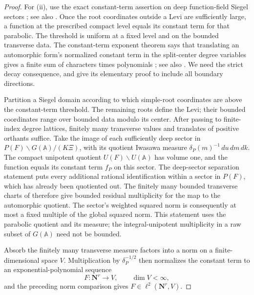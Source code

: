 \begin{proof}
 For (ii), use the exact constant-term assertion on deep
 function-field Siegel sectors
 \cite[Chapter I, Section 5.9, p.~107]{MorrisI}; see also
 \cite[Section I.2.7]{MW}.  Once the root coordinates outside a Levi
 are sufficiently large, a function at the prescribed compact level
 equals its constant term for that parabolic.  The threshold is
 uniform at a fixed level and on the bounded transverse data.
 The constant-term exponent theorem says that translating an
 automorphic form's normalized constant term in the split-center
 degree variables gives a finite sum of characters times polynomials
 \cite[Section 6.2, pp.~200--201, Equations (6.1)--(6.3)]{BernsteinLapid};
 see also \cite[Sections I.3.1--I.3.2 and I.4.2]{MW}.
 We need the strict decay consequence, and give its elementary proof
 to include all boundary directions.

 Partition a Siegel domain according to which simple-root coordinates
 are above the constant-term threshold.  The remaining roots define
 the Levi; their bounded coordinates range over bounded data modulo
 its center.  After passing to finite-index degree lattices, finitely
 many transverse values and translates of positive orthants suffice.
 Take the image of each sufficiently deep sector in
 $P(F)\backslash G(\mathbb A)/(K\Xi)$, with its quotient Iwasawa
 measure $\delta_P(m)^{-1}\,du\,dm\,dk$.
 The compact unipotent quotient $U(F)\backslash U(\mathbb A)$ has
 volume one, and the function equals its constant term $f_P$ on
 this sector.  The deep-sector separation statement
 \cite[Chapter I, Section 4.2, p.~101]{MorrisI} puts every additional
 rational identification within a sector in $P(F)$, which has
 already been quotiented out.  The finitely many bounded transverse
 charts of \cite[Chapter I, Section 4.6, pp.~102--103]{MorrisI}
 therefore give bounded residual multiplicity for the map to the
 automorphic quotient.  The sector's weighted squared norm is
 consequently at most a fixed multiple of the global squared norm.
 This statement uses the parabolic quotient and its measure;
 the integral-unipotent multiplicity in a raw subset of
 $G(\mathbb A)$ need not be bounded.

 Absorb the finitely many transverse measure factors into a norm
 on a finite-dimensional space $V$.  Multiplication by
 $\delta_P^{-1/2}$ then normalizes the constant term to an
 exponential-polynomial sequence
 \[
      F\colon\mathbf N^r\longrightarrow V,
      \qquad \dim V<\infty,
 \]
 and the preceding norm comparison gives
 $F\in\ell^2(\mathbf N^r,V)$.


\end{proof}
